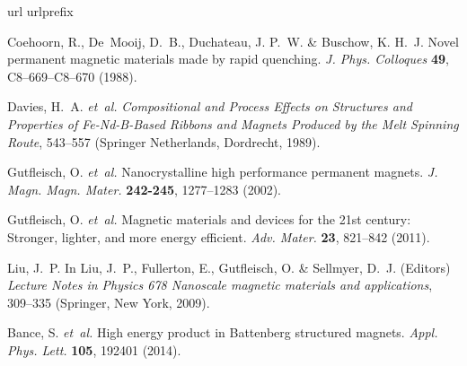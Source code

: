 \documentclass[prm,twocolumn,showkeys,preprintnumbers,amsmath,amssymb,superscriptaddress,aps,10pt]{revtex4-1}
\begin{document}
\begin{thebibliography}{10}
\expandafter\ifx\csname url\endcsname\relax
  \def\url#1{\texttt{#1}}\fi
\expandafter\ifx\csname urlprefix\endcsname\relax\def\urlprefix{URL }\fi
\providecommand{\bibinfo}[2]{#2}
\providecommand{\eprint}[2][]{\url{#2}}

\bibinfo{author}{Coehoorn, R.}, \bibinfo{author}{De~Mooij, D.~B.},
  \bibinfo{author}{Duchateau, J. P.~W.} \& \bibinfo{author}{Buschow, K. H.~J.}
\newblock \bibinfo{title}{Novel permanent magnetic materials made by rapid quenching}.
\newblock \emph{\bibinfo{journal}{J. Phys. Colloques}}
  \textbf{\bibinfo{volume}{49}}, \bibinfo{pages}{C8--669--C8--670}
  (\bibinfo{year}{1988}).

\bibinfo{author}{Davies, H.~A.} \emph{et~al.}
\newblock \emph{\bibinfo{title}{Compositional and Process Effects on Structures and Properties of Fe-Nd-B-Based Ribbons and Magnets Produced by the Melt Spinning Route}}, \bibinfo{pages}{543--557} (\bibinfo{publisher}{Springer
  Netherlands}, \bibinfo{address}{Dordrecht}, \bibinfo{year}{1989}).

\bibinfo{author}{Gutfleisch, O.} \emph{et~al.}
\newblock \bibinfo{title}{Nanocrystalline high performance permanent magnets}.
\newblock \emph{\bibinfo{journal}{J. Magn. Magn. Mater.}}
  \textbf{\bibinfo{volume}{242-245}}, \bibinfo{pages}{1277--1283}
  (\bibinfo{year}{2002}).

\bibinfo{author}{Gutfleisch, O.} \emph{et~al.}
\newblock \bibinfo{title}{Magnetic materials and devices for the 21st century: Stronger, lighter, and more energy efficient}.
\newblock \emph{\bibinfo{journal}{Adv. Mater.}} \textbf{\bibinfo{volume}{23}},
  \bibinfo{pages}{821--842} (\bibinfo{year}{2011}).

\bibinfo{author}{Liu, J.~P.}
\newblock In \bibinfo{Editor}{Liu, J.~P.}, \bibinfo{Editor}{Fullerton, E.},
  \bibinfo{Editor}{Gutfleisch, O.} \& \bibinfo{Editor}{Sellmyer, D.~J.} (Editors)
  \emph{\bibinfo{booktitle}{Lecture Notes in Physics 678 Nanoscale magnetic materials and applications}}, \bibinfo{pages}{309--335} (\bibinfo{publisher}{Springer},
  \bibinfo{address}{New York}, \bibinfo{year}{2009}).

\bibinfo{author}{Bance, S.} \emph{et~al.}
\newblock \bibinfo{title}{High energy product in Battenberg structured magnets}.
\newblock \emph{\bibinfo{journal}{Appl. Phys. Lett.}}
  \textbf{\bibinfo{volume}{105}}, \bibinfo{pages}{192401} (\bibinfo{year}{2014}).


\end{thebibliography}
\end{document}
